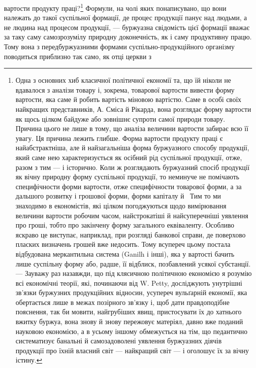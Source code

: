 \parcont{}  %
вартости продукту праці?\footnote{
Одна з основних хиб класичної політичної економії та, що їй ніколи
не вдавалося з аналізи товару і, зокрема, товарової вартости вивести
форму вартости, яка саме й робить вартість міновою вартістю. Саме в особі
своїх найкращих представників, А. Сміса й Рікарда, вона розглядає форму
вартости як щось цілком байдуже або зовнішнє супроти самої природи
товару. Причина цього не лише в тому, що аналіза величини вартости
забирає всю її увагу. Ця причина лежить глибше. Форма вартости продукту
праці є найабстрактніша, але й найзагальніша форма буржуазного
способу продукції, який саме нею характеризується як осібний рід суспільної
продукції, отже, разом з тим — і історично. Коли ж розглядають
буржуазний спосіб продукції як вічну природну форму суспільної продукції,
то неминуче не помічають специфічности форми вартости, отже
специфічности товарової форми, а за дальшого розвитку і грошової форми,
форми капіталу й~ Тим то ми знаходимо в економістів, які цілком
погоджуються щодо вимірювання величини вартости робочим часом, найстрокатіші
й найсуперечніші уявлення про гроші, тобто про закінчену
форму загального еквіваленту. Особливо яскраво це виступає, наприклад,
при розгляді банкової справи, де поверхово пласких визначень грошей
вже недосить. Тому всупереч цьому постала відбудована меркантильна
система (Ganilh і інші), яка у вартості бачить лише суспільну форму
або, радше, її відблиск, позбавлений усякої субстанції. — Зауважу раз
назавжди, що під клясичною політичною економією я розумію всі економічні
теорії, які, починаючи від W. Petty, досліджують унутрішні зв’язки
буржузних продукційних відносин, усупереч вульґарній економії, яка
обертається лише в межах позірного зв’язку і, щоб дати правдоподібне
пояснення, так би мовити, найгрубіших явищ, пристосувати їх до хатнього
вжитку буржуа, вона знову й знову пережовує матеріял, давно вже поданий
науковою економією, а в усьому іншому обмежується на тім, що
педантично систематизує банальні й самозадоволені уявлення буржуазних
діячів продукції про їхній власний світ — найкращий світ — і оголошує
їх за вічну істину.
} Формули, на чолі яких понаписувано,
що вони належать до такої суспільної формації, де процес продукції
панує над людьми, а не людина над процесом продукції, —
буржуазна свідомість цієї формації вважає за таку саму самозрозумілу
природну доконечність, як і саму продуктивну працю.
Тому вона з передбуржуазними формами суспільно-продукційного
організму поводиться приблизно так само, як отці церкви з
